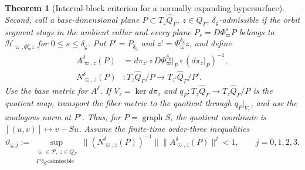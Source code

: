 \documentclass[11pt]{amsart}
\numberwithin{equation}{section}
\newtheorem{theorem}{Theorem}[section]
\theoremstyle{definition}
\theoremstyle{remark}
\begin{document}
\begin{theorem}[Interval-block criterion for a normally expanding
hypersurface]
Second, call a base-dimensional plane
$P\subset T_z\widehat Q_\Gamma$, $z\in Q_\Gamma$,
$\delta_{\mathrm g}$-admissible if the orbit segment stays in the ambient
collar and every plane $P_s=D\Phi_\varpi^sP$ belongs to
$\mathcal H_{\varpi,\Phi_\varpi^sz}$ for
$0\le s\le\delta_{\mathrm g}$.  Put
$P'=P_{\delta_{\mathrm g}}$ and $z'=\Phi_\varpi^{\delta_{\mathrm g}}z$,
and define
\begin{align*}
 A^\delta_{\varpi,z}(P)
  &=d\pi_{z'}\circ D\Phi_\varpi^{\delta_{\mathrm g}}|_P
       \circ(d\pi_z|_P)^{-1},\\
 N^\delta_{\varpi,z}(P)
  &:T_z\widehat Q_\Gamma/P
       \longrightarrow T_{z'}\widehat Q_\Gamma/P'.
\end{align*}
Use the base metric for $A^\delta$.  If
$V_z=\ker d\pi_z$ and
$q_P:T_z\widehat Q_\Gamma\to T_z\widehat Q_\Gamma/P$ is the quotient
map, transport the fiber metric to the quotient through
$q_P|_{V_z}$, and use the analogous norm at $P'$.  Thus, for
$P=\operatorname{graph}S$, the quotient coordinate is
$[(u,v)]\mapsto v-Su$.  Assume the finite-time order-three inequalities
\begin{equation}\label{eq:alg-intrinsic-rate-gaps}
 \vartheta_{\mathrm g,j}:=
 \sup_{\substack{\varpi\in\mathcal P,\ z\in Q_\Gamma\\
                  P\ \delta_{\mathrm g}\text{-admissible}}}
 \bigl\|(N^\delta_{\varpi,z}(P))^{-1}\bigr\|
 \bigl\|A^\delta_{\varpi,z}(P)\bigr\|^j<1,
 \qquad j=0,1,2,3.
\end{equation}


\end{theorem}
\end{document}
